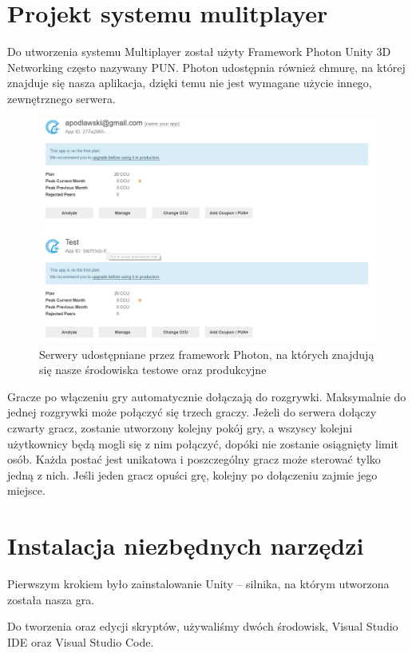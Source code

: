 \documentclass[openright]{xmgr}
\begin{document}
  \section{Projekt systemu mulitplayer}

    Do utworzenia systemu Multiplayer został użyty Framework Photon Unity 3D Networking często nazywany PUN. 
    Photon udostępnia również chmurę, na której znajduje się nasza aplikacja, dzięki temu nie jest wymagane użycie innego, zewnętrznego serwera. 
    \begin{figure}[H]
      \center
      \includegraphics[width=\textwidth]{maszyny.png}
      \caption{Serwery udostępniane przez framework Photon, na których znajdują się nasze środowiska testowe oraz produkcyjne}
    \end{figure}
    Gracze po włączeniu gry automatycznie dołączają do rozgrywki. Maksymalnie do jednej rozgrywki może połączyć się trzech graczy. Jeżeli do serwera dołączy czwarty gracz, zostanie utworzony kolejny pokój gry, a wszyscy kolejni użytkownicy będą mogli się z nim połączyć, dopóki nie zostanie osiągnięty limit osób. 
    Każda postać jest unikatowa i poszczególny gracz może sterować tylko jedną z nich. Jeśli jeden gracz opuści grę, kolejny po dołączeniu zajmie jego miejsce. 

  \section{Instalacja niezbędnych narzędzi}

    Pierwszym krokiem było zainstalowanie Unity – silnika, na którym utworzona została nasza gra. 

    Do tworzenia oraz edycji skryptów, używaliśmy dwóch środowisk, Visual Studio IDE oraz Visual Studio Code. 
\end{document}

